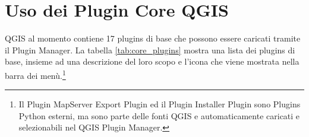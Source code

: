 
\section{Uso dei Plugin Core QGIS}\label{sec:core_plugins}


QGIS al momento contiene 17 plugins di base che possono essere caricati tramite
il Plugin Manager.
La tabella \ref{tab:core_plugins} mostra una lista dei plugins di base, insieme
ad una descrizione del loro scopo e l'icona che viene mostrata nella barra dei
menù.\footnote{Il Plugin MapServer
Export Plugin ed il Plugin Installer Plugin sono Plugins Python esterni,
ma sono parte delle fonti QGIS e automaticamente caricati e selezionabili nel QGIS Plugin Manager.}

